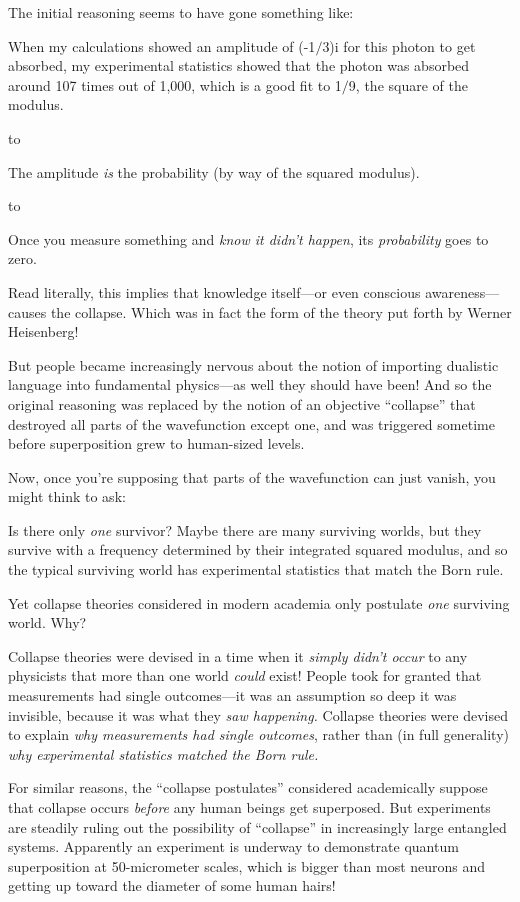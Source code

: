 {
 The initial reasoning seems to have gone something like:}

{
 When my calculations showed an amplitude of (-1$/$3)i for this
photon to get absorbed, my experimental statistics showed that the
photon was absorbed around 107 times out of 1,000, which is a good fit
to 1$/$9, the square of the modulus.}

{
 to}

{
 The amplitude \textit{is} the probability (by way of the squared
modulus).}

{
 to}

{
 Once you measure something and \textit{know it
didn't happen}, its \textit{probability} goes to zero.}

{
 Read literally, this implies that knowledge itself---or even
conscious awareness---causes the collapse. Which was in fact the form
of the theory put forth by Werner Heisenberg!}

{
 But people became increasingly nervous about the notion of
importing dualistic language into fundamental physics---as well they
should have been! And so the original reasoning was replaced by the
notion of an objective ``collapse''
that destroyed all parts of the wavefunction except one, and was
triggered sometime before superposition grew to human-sized levels.}

{
 Now, once you're supposing that parts of the
wavefunction can just vanish, you might think to ask:}

{
 Is there only \textit{one} survivor? Maybe there are many
surviving worlds, but they survive with a frequency determined by their
integrated squared modulus, and so the typical surviving world has
experimental statistics that match the Born rule.}

{
 Yet collapse theories considered in modern academia only postulate
\textit{one} surviving world. Why?}

{
 Collapse theories were devised in a time when it \textit{simply
didn't occur} to any physicists that more than one
world \textit{could} exist! People took for granted that measurements
had single outcomes---it was an assumption so deep it was invisible,
because it was what they \textit{saw happening.} Collapse theories were
devised to explain \textit{why measurements had single outcomes},
rather than (in full generality) \textit{why experimental statistics
matched the Born rule.}}

{
 For similar reasons, the ``collapse
postulates'' considered academically suppose that
collapse occurs \textit{before} any human beings get superposed. But
experiments are steadily ruling out the possibility of
``collapse'' in increasingly large
entangled systems. Apparently an experiment is underway to demonstrate
quantum superposition at 50-micrometer scales, which is bigger than
most neurons and getting up toward the diameter of some human hairs!}

